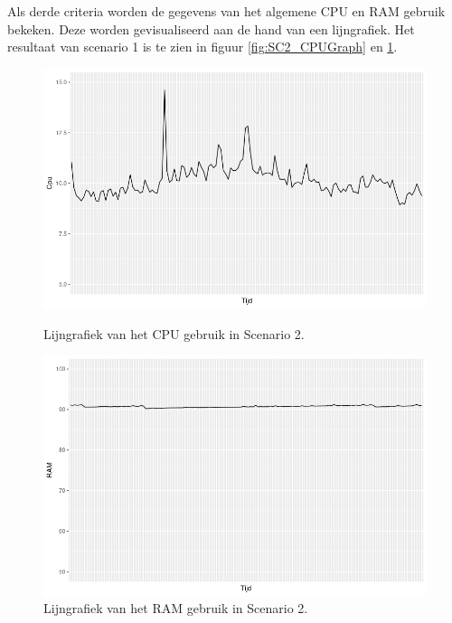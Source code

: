 Als derde criteria worden de gegevens van het algemene CPU en RAM gebruik bekeken. Deze worden gevisualiseerd aan de hand van een lijngrafiek. Het resultaat van scenario 1 is te zien in figuur \ref{fig:SC2_CPUGraph} en \ref{fig:SC2_RAMGraph}. 
\begin{figure}[h]
	\centering
	\begin{minipage}[h]{0.45\linewidth}
		\includegraphics[width=\linewidth]{img/SC2_CPUGraph.png}
		\caption{Lijngrafiek van het CPU gebruik in Scenario 2.}
		\label{fig:SC2_CPUGraph}
	\end{minipage}
	\quad
	\begin{minipage}[h]{0.45\linewidth}
		\includegraphics[width=\linewidth]{img/SC2_RAMGraph.png}
		\caption{Lijngrafiek van het RAM gebruik in Scenario 2.}
		\label{fig:SC2_RAMGraph}
	\end{minipage}
\end{figure}

%


